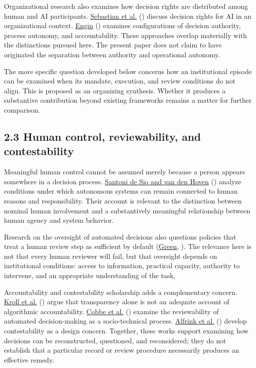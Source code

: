 \documentclass[
  10pt,
]{article}
\newcommand{\axCite}[2]{\hyperlink{cite.#1}{#2}, \citeyear{#1}}
\newcommand{\axCitet}[2]{\hyperlink{cite.#1}{#2} (\citeyear{#1})}
\begin{document}
Organizational research also examines how decision rights are
distributed among human and AI participants. \axCitet{sebastian2026decision}{Sebastian et al.}
discuss decision rights for AI in an organizational context. \axCitet{engin2026human}{Engin} examines configurations of decision authority, process autonomy,
and accountability. These approaches overlap materially with the
distinctions pursued here. The present paper does not claim to have
originated the separation between authority and operational autonomy.

The more specific question developed below concerns how an institutional
episode can be examined when its mandate, execution, and review
conditions do not align. This is proposed as an organizing synthesis.
Whether it produces a substantive contribution beyond existing
frameworks remains a matter for further comparison.

\subsection{2.3 Human control, reviewability, and
contestability}\label{human-control-reviewability-and-contestability}

Meaningful human control cannot be assumed merely because a person
appears somewhere in a decision process. \axCitet{santonidesio2018meaningful}{Santoni de Sio and van den Hoven} analyze conditions under which autonomous systems can
remain connected to human reasons and responsibility. Their account is
relevant to the distinction between nominal human involvement and a
substantively meaningful relationship between human agency and system
behavior.

Research on the oversight of automated decisions also questions policies
that treat a human review step as sufficient by default (\axCite{green2022flaws}{Green}).
The relevance here is not that every human reviewer will fail, but that
oversight depends on institutional conditions: access to information,
practical capacity, authority to intervene, and an appropriate
understanding of the task.

Accountability and contestability scholarship adds a complementary
concern. \axCitet{kroll2017accountable}{Kroll et al.} argue that transparency alone is not an
adequate account of algorithmic accountability. \axCitet{cobbe2021reviewable}{Cobbe et al.}
examine the reviewability of automated decision-making as a
socio-technical process. \axCitet{alfrink2023contestable}{Alfrink et al.} develop contestability as
a design concern. Together, these works support examining how decisions
can be reconstructed, questioned, and reconsidered; they do not
establish that a particular record or review procedure necessarily
produces an effective remedy.
\end{document}

